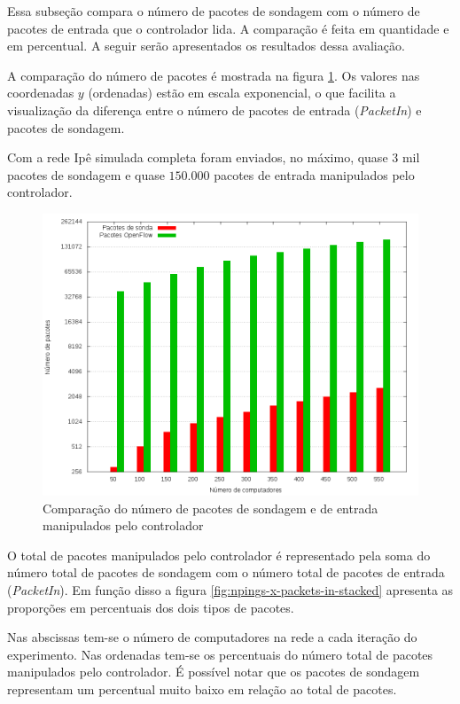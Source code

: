 Essa subseção compara o número de pacotes de sondagem com o número de pacotes
de entrada que o controlador lida.
A comparação é feita em quantidade e em percentual.
A seguir serão apresentados os resultados dessa avaliação.

A comparação do número de pacotes é mostrada na figura
\ref{fig:npings-x-packets-in}.
Os valores nas coordenadas $y$ (ordenadas) estão em escala exponencial, o que 
facilita a visualização da diferença entre o número de pacotes de entrada
(\emph{PacketIn}) e pacotes de sondagem.

Com a rede Ipê simulada completa foram enviados, no máximo, quase $3$ mil 
pacotes de sondagem e quase $150.000$ pacotes de entrada manipulados pelo 
controlador.
\break
\begin{figure}[!htb]
    \centering
    \label{fig:npings-x-packets-in}
    \includegraphics[width=\linewidth]{img/npings-x-packets-in}
    \caption{Comparação do número de pacotes de sondagem e de entrada 
    manipulados pelo controlador}
\end{figure}

O total de pacotes manipulados pelo controlador é representado pela soma 
do número total de pacotes de sondagem com o número total de pacotes de 
entrada (\emph{PacketIn}).
Em função disso a figura \ref{fig:npings-x-packets-in-stacked} apresenta 
as proporções em percentuais dos dois tipos de pacotes.

Nas abscissas tem-se o número de computadores na rede a cada iteração do 
experimento.
Nas ordenadas tem-se os percentuais do número total de pacotes manipulados 
pelo controlador.
É possível notar que os pacotes de sondagem representam um percentual muito 
baixo em relação ao total de pacotes.


